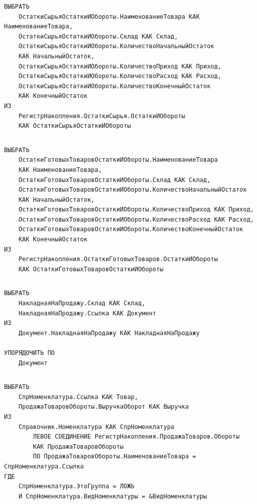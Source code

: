 \documentclass[12pt,a4paper]{article}
\begin{document}
\begin{appendices}
\begin{verbatim}
ВЫБРАТЬ
    ОстаткиСырьяОстаткиИОбороты.НаименованиеТовара КАК НаименованиеТовара,
    ОстаткиСырьяОстаткиИОбороты.Склад КАК Склад,
    ОстаткиСырьяОстаткиИОбороты.КоличествоНачальныйОстаток
    КАК НачальныйОстаток,
    ОстаткиСырьяОстаткиИОбороты.КоличествоПриход КАК Приход,
    ОстаткиСырьяОстаткиИОбороты.КоличествоРасход КАК Расход,
    ОстаткиСырьяОстаткиИОбороты.КоличествоКонечныйОстаток
    КАК КонечныйОстаток
ИЗ
    РегистрНакопления.ОстаткиСырья.ОстаткиИОбороты
    КАК ОстаткиСырьяОстаткиИОбороты
\end{verbatim}

\begin{lstlisting}[caption=Запрос к отчету <<Сырье>>]
\end{lstlisting}

\begin{verbatim}
ВЫБРАТЬ
    ОстаткиГотовыхТоваровОстаткиИОбороты.НаименованиеТовара
    КАК НаименованиеТовара,
    ОстаткиГотовыхТоваровОстаткиИОбороты.Склад КАК Склад,
    ОстаткиГотовыхТоваровОстаткиИОбороты.КоличествоНачальныйОстаток
    КАК НачальныйОстаток,
    ОстаткиГотовыхТоваровОстаткиИОбороты.КоличествоПриход КАК Приход,
    ОстаткиГотовыхТоваровОстаткиИОбороты.КоличествоРасход КАК Расход,
    ОстаткиГотовыхТоваровОстаткиИОбороты.КоличествоКонечныйОстаток
    КАК КонечныйОстаток
ИЗ
    РегистрНакопления.ОстаткиГотовыхТоваров.ОстаткиИОбороты
    КАК ОстаткиГотовыхТоваровОстаткиИОбороты
\end{verbatim}

\begin{lstlisting}[caption=Запрос к отчету <<ГотоваяПродукция>>]
\end{lstlisting}

\begin{verbatim}
ВЫБРАТЬ
    НакладнаяНаПродажу.Склад КАК Склад,
    НакладнаяНаПродажу.Ссылка КАК Документ
ИЗ
    Документ.НакладнаяНаПродажу КАК НакладнаяНаПродажу

УПОРЯДОЧИТЬ ПО
    Документ
\end{verbatim}

\begin{lstlisting}[caption=Запрос к отчету <<Реестр документов Накладная на продажу>>]
\end{lstlisting}

\begin{verbatim}
ВЫБРАТЬ
    СпрНоменклатура.Ссылка КАК Товар,
    ПродажаТоваровОбороты.ВыручкаОборот КАК Выручка
ИЗ
    Справочник.Номенклатура КАК СпрНоменклатура
        ЛЕВОЕ СОЕДИНЕНИЕ РегистрНакопления.ПродажаТоваров.Обороты
        КАК ПродажаТоваровОбороты
        ПО ПродажаТоваровОбороты.НаименованиеТовара = СпрНоменклатура.Ссылка
ГДЕ
    СпрНоменклатура.ЭтоГруппа = ЛОЖЬ
    И СпрНоменклатура.ВидНоменклатуры = &ВидНоменклатуры


\end{verbatim}
\end{appendices}
\end{document}
